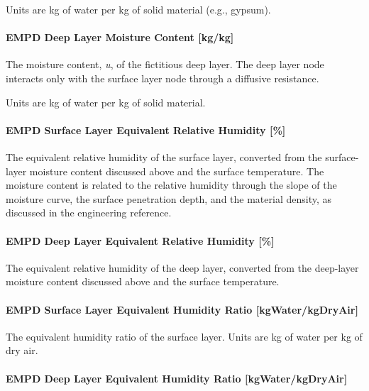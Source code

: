 Units are kg of water per kg of solid material (e.g., gypsum).

\paragraph{EMPD Deep Layer Moisture Content
	{[}kg/kg{]}}\label{empd-deep-layer-moisture-content-kgkg}

The moisture content, \emph{u}, of the fictitious deep layer. The deep
layer node interacts only with the surface layer node through a
diffusive resistance.

Units are kg of water per kg of solid material.

\paragraph{EMPD Surface Layer Equivalent Relative Humidity
	{[}\%{]}}\label{empd-surface-layer-equivalent-relative-humidity}

The equivalent relative humidity of the surface layer, converted from
the surface-layer moisture content discussed above and the surface
temperature. The moisture content is related to the relative humidity
through the slope of the moisture curve, the surface penetration depth,
and the material density, as discussed in the engineering reference.

\paragraph{EMPD Deep Layer Equivalent Relative Humidity
	{[}\%{]}}\label{empd-deep-layer-equivalent-relative-humidity}

The equivalent relative humidity of the deep layer, converted from the
deep-layer moisture content discussed above and the surface temperature.

\paragraph{EMPD Surface Layer Equivalent Humidity Ratio
	{[}kgWater/kgDryAir{]}}\label{empd-surface-layer-equivalent-humidity-ratio-kgwaterkgdryair}

The equivalent humidity ratio of the surface layer. Units are kg of
water per kg of dry air.

\paragraph{EMPD Deep Layer Equivalent Humidity Ratio
	{[}kgWater/kgDryAir{]}}\label{empd-deep-layer-equivalent-humidity-ratio-kgwaterkgdryair}

